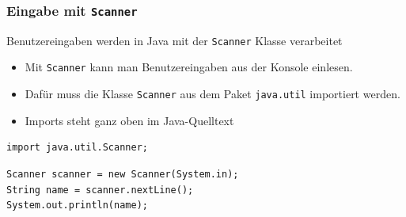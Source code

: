 
\begin{frame}[fragile]
	\frametitle{Eingabe mit \texttt{Scanner}}
	\pause
	Benutzereingaben werden in Java mit der \texttt{Scanner} Klasse verarbeitet
	\pause
	\begin{itemize}
		\item Mit \texttt{Scanner} kann man Benutzereingaben aus der Konsole einlesen.
		      \pause
		\item Dafür muss die Klasse \texttt{Scanner} aus dem Paket \texttt{java.util} importiert werden.
		      \pause
		\item Imports steht ganz oben im Java-Quelltext
	\end{itemize}
	\pause
	\begin{verbatim}
import java.util.Scanner;
\end{verbatim}
	\pause
	\begin{verbatim}
Scanner scanner = new Scanner(System.in);
String name = scanner.nextLine();
System.out.println(name);
  \end{verbatim}
\end{frame}
